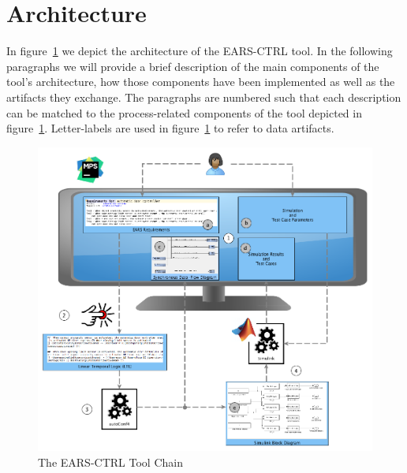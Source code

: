 \section{Architecture}
\vspace{-.3cm}In figure~\ref{fig:ears_ctrl_toolchain} we depict the architecture
of the \textsf{EARS-CTRL} tool. In the following paragraphs we will provide a
brief description of the main components of the tool's architecture, how those
components have been implemented as well as the artifacts they exchange. The
paragraphs are numbered such that each description can be matched to the
process-related components of the tool depicted in
figure~\ref{fig:ears_ctrl_toolchain}.
Letter-labels are used in figure~\ref{fig:ears_ctrl_toolchain} to refer to data
artifacts.\vspace{-.3cm}
\begin{figure}[h!] 
   \begin{center}
     \includegraphics[width=.9\textwidth]{images/toolchain.png}
     \caption{The \textsf{EARS-CTRL} Tool Chain}
     \label{fig:ears_ctrl_toolchain}
   \end{center}
      \vspace{-1cm}
 \end{figure}
\vspace{0cm}
